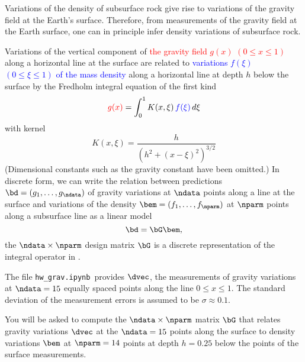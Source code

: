 \documentclass[11pt,titlepage,fleqn]{article}
\newcommand{\tfile}{{\tt hw\_grav.ipynb}}
\newcommand{\numdataG}{15}
\newcommand{\numparmG}{14}
\newcommand{\mv}{\xi}  %
\newcommand{\dv}{x}  %
\newcommand{\dep}{h}
\begin{document}
Variations of the density of subsurface rock give rise to variations of the gravity field at the Earth's surface. Therefore, from measurements of the gravity field at the Earth surface, one can in principle infer density variations of subsurface rock.

Variations of the vertical component of \textcolor{red}{the gravity field $g(\dv)$ $(0 \le \dv \le 1)$} along a horizontal line at the surface are related to \textcolor{blue}{variations $f(\mv)$ $(0 \le \mv \le 1)$ of the mass density} along a horizontal line at depth $\dep$ below the surface by the Fredholm integral equation of the first kind \citep[\eg][eq.~1.31]{Aster}
%
\begin{equation}
\textcolor{red}{g(\dv)} = \int_0^1 K(\dv,\mv)\,\textcolor{blue}{f(\mv)}\,d\mv
\label{gs}
\end{equation}
%
with kernel
%
\begin{equation}
K(\dv,\mv) = \frac{\dep}{\left(\dep^2 + (\dv-\mv)^2\right)^{3/2}}
\label{Kxy}
\end{equation}
%
(Dimensional constants such as the gravity constant have been omitted.) In discrete form, we can write the relation between predictions $\bd = (g_1,\ldots,g_\ndata)$ of gravity variations at $\ndata$ points along a line at the surface and variations of the density $\bem = (f_1,\ldots,f_\nparm)$ at $\nparm$ points along a subsurface line as a linear model
%
\begin{equation}
\bd = \bG\bem,
\end{equation}
%
the $\ndata \times \nparm$ design matrix $\bG$ is a discrete representation of the integral operator in .

The file \tfile\ provides $\dvec$, the measurements of gravity variations at $\ndata = \numdataG$ equally spaced points along the line $0 \le \dv \le 1$. The standard deviation of the measurement errors is assumed to be $\sigma \approx 0.1$.

You will be asked to compute
the $\ndata \times \nparm$ matrix $\bG$ that relates gravity variations $\dvec$ at the $\ndata=\numdataG$ points along the surface to density variations $\bem$ at $\nparm = \numparmG$ points at depth $\dep = 0.25$ below the points of the surface measurements. 
\end{document}
